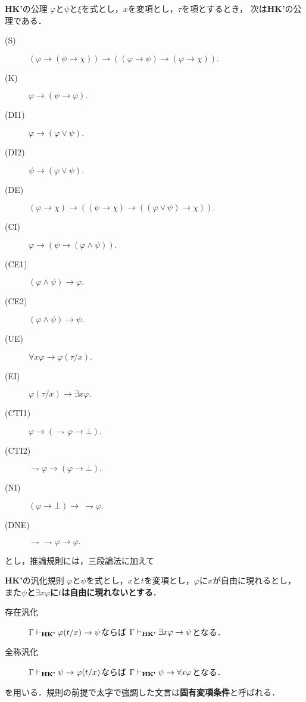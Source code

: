	\begin{itembox}[l]{{\bf HK'}の公理}
		$\varphi$と$\psi$と$\xi$を式とし，$x$を変項とし，$\tau$を項とするとき，
		次は{\bf HK'}の公理である．
		\begin{description}
			\item[(S)] $(\varphi \rightarrow (\psi \rightarrow \chi)) 
				\rightarrow ((\varphi \rightarrow \psi)
				\rightarrow (\varphi \rightarrow \chi)).$
			\item[(K)] $\varphi \rightarrow (\psi \rightarrow \varphi).$
			\item[(DI1)] $\varphi \rightarrow (\varphi \vee \psi).$
			\item[(DI2)] $\psi \rightarrow (\varphi \vee \psi).$
			\item[(DE)] $(\varphi \rightarrow \chi) \rightarrow 
				((\psi \rightarrow \chi) \rightarrow ((\varphi \vee \psi) \rightarrow \chi)).$
			\item[(CI)] $\varphi \rightarrow (\psi \rightarrow (\varphi \wedge \psi)).$
			\item[(CE1)] $(\varphi \wedge \psi) \rightarrow \varphi.$
			\item[(CE2)] $(\varphi \wedge \psi) \rightarrow \psi.$
			
			\item[(UE)] $\forall x \varphi \rightarrow \varphi(\tau/x).$
			\item[(EI)] $\varphi(\tau/x) \rightarrow \exists x \varphi.$
			
			\item[(CTI1)] $\varphi \rightarrow (\rightharpoondown \varphi \rightarrow \bot).$
			
			\item[(CTI2)] $\rightharpoondown \varphi \rightarrow (\varphi \rightarrow \bot).$
			
			\item[(NI)] $(\varphi \rightarrow \bot) \rightarrow\ \rightharpoondown \varphi.$
			\item[(DNE)] $\rightharpoondown \rightharpoondown \varphi \rightarrow \varphi.$
		\end{description}
	\end{itembox}
	
	とし，推論規則には，三段論法に加えて
	
	\begin{itembox}[l]{{\bf HK'}の汎化規則}
		$\varphi$と$\psi$を式とし，$x$と$t$を変項とし，$\varphi$に$x$が自由に現れるとし，
		また{\bf $\psi$と$\exists x \varphi$に$t$は自由に現れないとする}．
		\begin{description}
			\item[存在汎化] 
				$\Gamma \vdash_{{\scriptsize \mbox{{\bf HK'}}}} \varphi(t/x) \rightarrow \psi$ならば
				$\Gamma \vdash_{{\scriptsize \mbox{{\bf HK'}}}} \exists x \varphi \rightarrow \psi$となる．
			
			\item[全称汎化] 
				$\Gamma \vdash_{{\scriptsize \mbox{{\bf HK'}}}} \psi \rightarrow \varphi(t/x)$ならば
				$\Gamma \vdash_{{\scriptsize \mbox{{\bf HK'}}}} \psi \rightarrow \forall x \varphi$となる．
		\end{description}
	\end{itembox}
	を用いる．規則の前提で太字で強調した文言は{\bf 固有変項条件}と呼ばれる．
	
